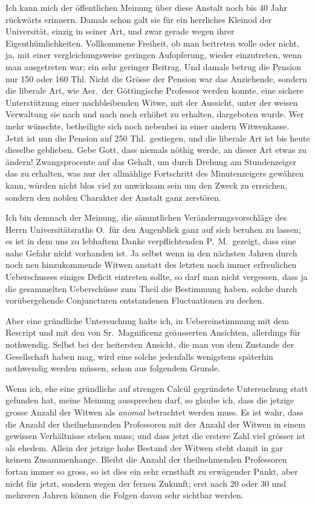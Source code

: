 \documentclass[12pt,a4paper]{article}
\begin{document}
Ich kann mich der \"offentlichen Meinung \"uber diese Anstalt noch bis 40 Jahr r\"uckw\"arts erinnern. Damals schon galt sie f\"ur ein herrliches Kleinod der Universit\"at, einzig in seiner Art, und zwar gerade wegen ihrer Eigenth\"umlichkeiten. Vollkommene Freiheit, ob man beitreten wolle oder nicht, ja, mit einer vergleichungsweise geringen Aufopferung, wieder einzutreten, wenn man ausgetreten war; ein sehr geringer Beitrag. Und damals betrug die Pension nur 150 oder 160 Thl. Nicht die Gr\"osse der Pension war das Anziehende, sondern die liberale Art, wie Aer.\ der G\"ottingische Professor werden konnte, eine sichere Unterst\"utzung einer nachbleibenden Witwe, mit der Aussicht, unter der weisen Verwaltung sie nach und nach noch erh\"ohet zu erhalten, dargeboten wurde. Wer mehr w\"unschte, betheiligte sich noch nebenbei in einer andern Witwenkasse. Jetzt ist nun die Pension auf 250 Thl.\ gestiegen, und die liberale Art ist bis heute dieselbe geblieben. Gebe Gott, dass niemals n\"othig werde, an dieser Art etwas zu \"andern! Zwangsprocente auf das Gehalt, um durch Drehung am Stundenzeiger das zu erhalten, was nur der allm\"ahlige Fortschritt des Minutenzeigers gew\"ahren kann, w\"urden nicht blos viel zu unwirksam sein um den Zweck zu erreichen, sondern den noblen Charakter der Anstalt ganz zerst\"oren.

Ich bin demnach der Meinung, die s\"ammtlichen Ver\"anderungsvorschl\"age des Herrn Universit\"atsraths O.\ f\"ur den Augenblick ganz auf sich beruhen zu lassen; es ist in dem uns zu lebhaftem Danke verpflichtenden P.\ M.\ gezeigt, dass eine nahe Gefahr nicht vorhanden ist. Ja selbst wenn in den n\"achsten Jahren durch noch neu hinzukommende Witwen anstatt des letzten noch immer erfreulichen Ueberschusses einiges Deficit eintreten sollte, so darf man nicht vergessen, dass ja die gesammelten Uebersch\"usse zum Theil die Bestimmung haben, solche durch vor\"ubergehende Conjuncturen entstandenen Fluctuationen zu decken.

Aber eine gr\"undliche Untersuchung halte ich, in Uebereinstimmung mit dem Rescript und mit den von Sr.\ Magnificenz ge\"ausserten Ansichten, allerdings f\"ur nothwendig. Selbst bei der heitersten Ansicht, die man von dem Zustande der Gesellschaft haben mag, wird eine solche jedenfalls wenigstens sp\"aterhin nothwendig werden m\"ussen, schon aus folgendem Grunde.

Wenn ich, ehe eine gr\"undliche auf strengen Calc\"ul gegr\"undete Untersuchung statt gefunden hat, meine Meinung aussprechen darf, so glaube ich, dass die jetzige grosse Anzahl der Witwen als \textit{anomal} betrachtet werden muss. Es ist wahr, dass die Anzahl der theilnehmenden Professoren mit der Anzahl der Witwen in einem gewissen Verh\"altnisse stehen muss; und dass jetzt die erstere Zahl viel gr\"osser ist als ehedem. Allein der jetzige hohe Bestand der Witwen steht damit in gar keinem Zusammenhange. Bleibt die Anzahl der theilnehmenden Professoren fortan immer so gross, so ist dies ein sehr ernsthaft zu erw\"agender Punkt, aber nicht f\"ur jetzt, sondern wegen der fernen Zukunft; erst nach 20 oder 30 und mehreren Jahren k\"onnen die Folgen davon sehr sichtbar werden.
\end{document}
